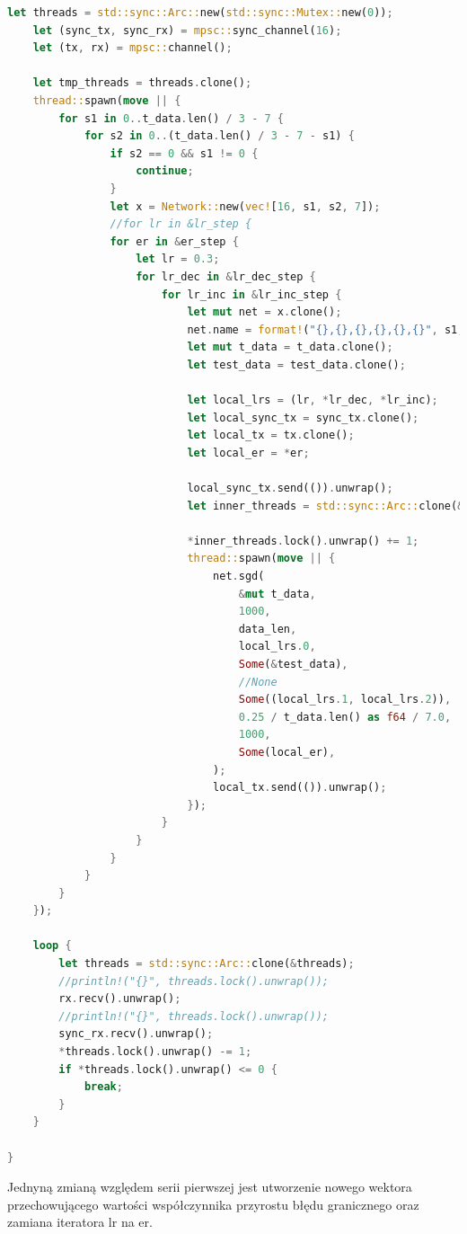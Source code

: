 \documentclass[12pt,twoside]{article}
\begin{document}
\begin{lstlisting}[language=Rust,caption=Kod wykorzystany do przeprowadzenia 3 serii eksperymentów,label={lst:test2}]
    let threads = std::sync::Arc::new(std::sync::Mutex::new(0));
    let (sync_tx, sync_rx) = mpsc::sync_channel(16);
    let (tx, rx) = mpsc::channel();

    let tmp_threads = threads.clone();
    thread::spawn(move || {
        for s1 in 0..t_data.len() / 3 - 7 {
            for s2 in 0..(t_data.len() / 3 - 7 - s1) {
                if s2 == 0 && s1 != 0 {
                    continue;
                }
                let x = Network::new(vec![16, s1, s2, 7]);
                //for lr in &lr_step {
                for er in &er_step {
                    let lr = 0.3;
                    for lr_dec in &lr_dec_step {
                        for lr_inc in &lr_inc_step {
                            let mut net = x.clone();
                            net.name = format!("{},{},{},{},{},{}", s1, s2, lr, lr_dec, lr_inc, er);
                            let mut t_data = t_data.clone();
                            let test_data = test_data.clone();

                            let local_lrs = (lr, *lr_dec, *lr_inc);
                            let local_sync_tx = sync_tx.clone();
                            let local_tx = tx.clone();
                            let local_er = *er;

                            local_sync_tx.send(()).unwrap();
                            let inner_threads = std::sync::Arc::clone(&tmp_threads);

                            *inner_threads.lock().unwrap() += 1;
                            thread::spawn(move || {
                                net.sgd(
                                    &mut t_data,
                                    1000,
                                    data_len,
                                    local_lrs.0,
                                    Some(&test_data),
                                    //None
                                    Some((local_lrs.1, local_lrs.2)),
                                    0.25 / t_data.len() as f64 / 7.0,
                                    1000,
                                    Some(local_er),
                                );
                                local_tx.send(()).unwrap();
                            });
                        }
                    }
                }
            }
        }
    });

    loop {
        let threads = std::sync::Arc::clone(&threads);
        //println!("{}", threads.lock().unwrap());
        rx.recv().unwrap();
        //println!("{}", threads.lock().unwrap());
        sync_rx.recv().unwrap();
        *threads.lock().unwrap() -= 1;
        if *threads.lock().unwrap() <= 0 {
            break;
        }
    }

}
\end{lstlisting}
Jednyną zmianą względem serii pierwszej jest utworzenie nowego wektora przechowującego wartości współczynnika przyrostu błędu granicznego oraz zamiana iteratora lr na er.
\end{document}
